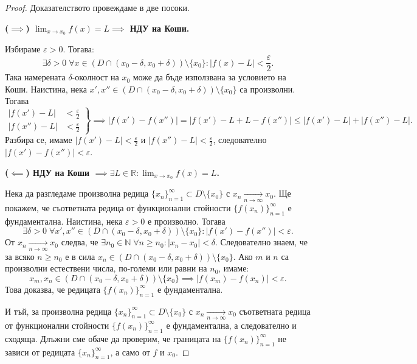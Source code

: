 \begin{proof}
Доказателството провеждаме в две посоки.

\medskip
\textbf{($\implies$) $\lim_{x \to x_0} f(x) = L \implies$ НДУ на Коши.}

Избираме $\varepsilon > 0$. Тогава:
\[
\exists \delta > 0 \; \forall x \in (D \cap (x_0 - \delta, x_0 + \delta)) \setminus \{x_0\} : |f(x) - L| < \frac{\varepsilon}{2}.
\]
Така намерената $\delta$-околност на $x_0$ може да бъде използвана за условието на Коши. Наистина, нека $x', x'' \in (D \cap (x_0 - \delta, x_0 + \delta)) \setminus \{x_0\}$ са произволни. Тогава
\[
\left.
\begin{aligned}
|f(x') - L| &< \frac{\varepsilon}{2} \\
|f(x'') - L| &< \frac{\varepsilon}{2}
\end{aligned}
\right\} \implies |f(x') - f(x'')| = |f(x') - L + L - f(x'')| \le |f(x') - L| + |f(x'') - L|.
\]
Разбира се, имаме $|f(x') - L| < \frac{\varepsilon}{2}$ и $|f(x'') - L| < \frac{\varepsilon}{2}$, следователно $|f(x') - f(x'')| < \varepsilon$.

\medskip
\textbf{($\impliedby$) НДУ на Коши $\implies \exists L \in \mathbb{R} : \lim_{x \to x_0} f(x) = L$.}

Нека да разгледаме произволна редица $\{x_n\}_{n=1}^{\infty} \subset D \setminus \{x_0\}$ с $x_n \xrightarrow[n \to \infty]{} x_0$. Ще покажем, че съответната редица от функционални стойности $\{f(x_n)\}_{n=1}^{\infty}$ е фундаментална. Наистина, нека $\varepsilon > 0$ е произволно. Тогава
\[
\exists \delta > 0 \; \forall x', x'' \in (D \cap (x_0 - \delta, x_0 + \delta)) \setminus \{x_0\} : |f(x') - f(x'')| < \varepsilon.
\]
От $x_n \xrightarrow[n \to \infty]{} x_0$ следва, че $\exists n_0 \in \mathbb{N} \; \forall n \ge n_0 : |x_n - x_0| < \delta$. Следователно знаем, че за всяко $n \ge n_0$ е в сила $x_n \in (D \cap (x_0 - \delta, x_0 + \delta)) \setminus \{x_0\}$. Ако $m$ и $n$ са произволни естествени числа, по-големи или равни на $n_0$, имаме:
\[
x_m, x_n \in (D \cap (x_0 - \delta, x_0 + \delta)) \setminus \{x_0\} \implies |f(x_m) - f(x_n)| < \varepsilon.
\]
Това доказва, че редицата $\{f(x_n)\}_{n=1}^{\infty}$ е фундаментална.

И тъй, за произволна редица $\{x_n\}_{n=1}^{\infty} \subset D \setminus \{x_0\}$ с $x_n \xrightarrow[n \to \infty]{} x_0$ съответната редица от функционални стойности $\{f(x_n)\}_{n=1}^{\infty}$ е фундаментална, а следователно и сходяща. Длъжни сме обаче да проверим, че границата на $\{f(x_n)\}_{n=1}^{\infty}$ не зависи от редицата $\{x_n\}_{n=1}^{\infty}$, а само от $f$ и $x_0$.


\end{proof}
